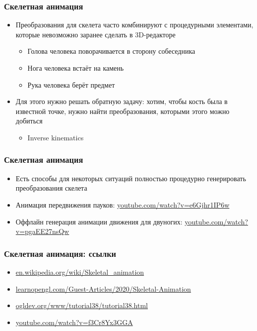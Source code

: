 \documentclass{beamer}
\begin{document}
\begin{frame}[fragile]
\frametitle{Скелетная анимация}
\begin{itemize}
\item Преобразования для скелета часто комбинируют с процедурными элементами, которые невозможно заранее сделать в 3D-редакторе
\pause
\begin{itemize}
\item Голова человека поворачивается в сторону собеседника
\item Нога человека встаёт на камень
\item Рука человека берёт предмет
\end{itemize}
\pause
\item Для этого нужно решать обратную задачу: хотим, чтобы кость была в известной точке, нужно найти преобразования, которыми этого можно добиться
\begin{itemize}
\item Inverse kinematics
\end{itemize}
\end{itemize}
\end{frame}

\begin{frame}[fragile]
\frametitle{Скелетная анимация}
\begin{itemize}
\item Есть способы для некоторых ситуаций полностью процедурно генерировать преобразования скелета
\pause
\item Анимация передвижения пауков: \href{https://www.youtube.com/watch?v=e6Gjhr1IP6w}{youtube.com/watch?v=e6Gjhr1IP6w}
\pause
\item Оффлайн генерация анимации движения для двуногих: \href{https://www.youtube.com/watch?v=pgaEE27nsQw}{youtube.com/watch?v=pgaEE27nsQw}
\end{itemize}
\end{frame}

\begin{frame}[fragile]
\frametitle{Скелетная анимация: ссылки}
\begin{itemize}
\item \href{https://en.wikipedia.org/wiki/Skeletal_animation}{en.wikipedia.org/wiki/Skeletal\_animation}
\item \href{https://learnopengl.com/Guest-Articles/2020/Skeletal-Animation}{learnopengl.com/Guest-Articles/2020/Skeletal-Animation}
\item \href{https://ogldev.org/www/tutorial38/tutorial38.html}{ogldev.org/www/tutorial38/tutorial38.html}
\item \href{https://www.youtube.com/watch?v=f3Cr8Yx3GGA}{youtube.com/watch?v=f3Cr8Yx3GGA}
\end{itemize}
\end{frame}
\end{document}
